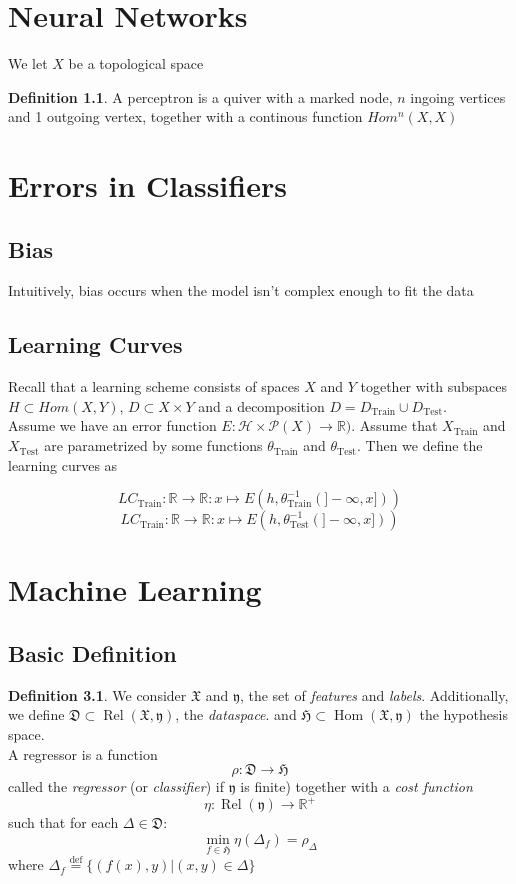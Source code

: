 \documentclass{book}
\theoremstyle{plain}
\theoremstyle{definition}
\newtheorem{definition}[corollary]{Definition}
\renewcommand{\d}[1]{\mathbb{#1}}
\newcommand{\define}{\stackrel{\operatorname{def}}{=}}
\newcommand{\f}[1]{\mathfrak{#1}}
\newcommand{\fun}{\mapsto}
\DeclareMathOperator{\Hom}{Hom}
\newcommand{\mor}{\longrightarrow}
\DeclareMathOperator{\Rel}{Rel}
\renewcommand{\r}[1]{\mathcal{#1}}
\DeclareMathOperator{\Test}{Test}
\DeclareMathOperator{\Train}{Train}
\begin{document}
\chapter{Neural Networks}
We let $X$ be a topological space
\begin{definition}
A perceptron is a quiver with a marked node, $n$ ingoing	 vertices and 1 outgoing vertex, together with a continous function $Hom^{n}(X,X)$
\end{definition}

\chapter{Errors in Classifiers}


\section{Bias}

Intuitively, bias occurs when the model isn't complex enough to fit the data




\section{Learning Curves}
Recall that a learning scheme consists of spaces $X$ and $Y$ together with subspaces $H\subset Hom(X,Y)$, $D\subset X\times Y$ and a decomposition $D=D_{\Train}\cup D_{\Test}$.\\
Assume we have an error function $E:\r{H}\times \r{P}(X)\mor \d{R})$. Assume that $X_{\Train}$ and $X_{\Test}$ are parametrized by some functions $\theta_{\Train}$ and $\theta_{\Test}$. Then we define the learning curves as

\[
LC_{\Train}:\d{R}\mor \d{R}: x\fun E(h,\theta_{\Train}^{-1}(]-\infty,x]))
\]
\[
LC_{\Train}:\d{R}\mor \d{R}: x\fun E(h,\theta_{\Test}^{-1}(]-\infty,x]))\]






\chapter{Machine Learning}

\section{Basic Definition}

\begin{definition}
We consider $\f{X}$ and $\f{y}$, the set of \emph{features} and \emph{labels}. Additionally, we define $\f{D}\subset \Rel(\f{X},\f{y})$, the \emph{dataspace}. and $\f{H}\subset \Hom (\f{X},\f{y})$ the hypothesis space.\\ A regressor is a function
\[
\rho: \f{D}\mor \f{H}
\]
called the \emph{regressor} (or \emph{classifier}) if $\f{y}$ is finite)
together with a \emph{cost function }
\[
\eta: \Rel(\f{y})\mor \d{R}^+
\]
such that for each $\Delta \in \f{D}$:
\[
\min_{f\in \f{H}} \eta(\Delta_f)=\rho_\Delta
\]
where $\Delta_f \define\{(f(x),y)\vert (x,y) \in \Delta \}$
\end{definition}
\end{document}
